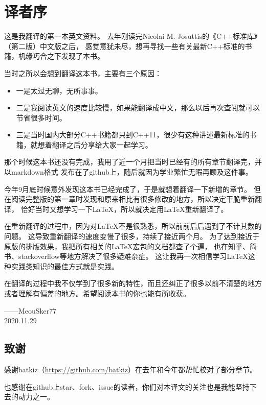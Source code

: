 \chapter{译者序}
这是我翻译的第一本英文资料。
去年刚读完Nicolai M. Josuttis的《C++标准库》（第二版）中文版之后，
感觉意犹未尽，想再寻找一些有关最新C++标准的书籍，机缘巧合之下发现了本书。

当时之所以会想到翻译这本书，主要有三个原因：
\begin{itemize}
    \item 一是太过无聊，无所事事。
    \item 二是我阅读英文的速度比较慢，如果能翻译成中文，那么以后再次查阅就可以节省很多时间。
    \item 三是当时国内大部分C++书籍都只到C++11，很少有这种讲述最新标准的书籍，就想着翻译之后分享给大家一起学习。
\end{itemize}

那个时候这本书还没有完成，我用了近一个月把当时已经有的所有章节翻译完，并以markdown格式
发布在了github上，随后就因为学业繁忙无暇再顾及这件事。

今年9月底时候意外发现这本书已经完成了，于是就想着翻译一下新增的章节。
但在阅读完整版的第一章时发现和原来相比有很多修改的地方，所以决定干脆重新翻译，
恰好当时又想学习一下\LaTeX，所以就决定用\LaTeX 重新翻译了。

在重新翻译的过程中，因为对\LaTeX 不是很熟悉，所以前前后后遇到了不计其数的问题。
这导致重新翻译的速度变慢了很多，持续了接近两个月。
为了达到接近于原版的排版效果，我把所有相关的\LaTeX 宏包的文档都查了个遍，
也在知乎、简书、stackoverflow等地方解决了很多疑难杂症。
这让我再一次相信学习\LaTeX 这种实践类知识的最佳方式就是实践。

在翻译的过程中我不仅学到了很多新的特性，而且还纠正了很多以前不清楚的地方
或者理解有偏差的地方。希望阅读本书的你也能有所收获。

\begin{flushright}
    ——MeouSker77\\
    2020.11.29
\end{flushright}


\section{致谢}
感谢batkiz（\url{https://github.com/batkiz}）在去年和今年都帮忙校对了部分章节。

也感谢在github上star、fork、issue的读者，你们对本译文的关注也是我能坚持下去的动力之一。
